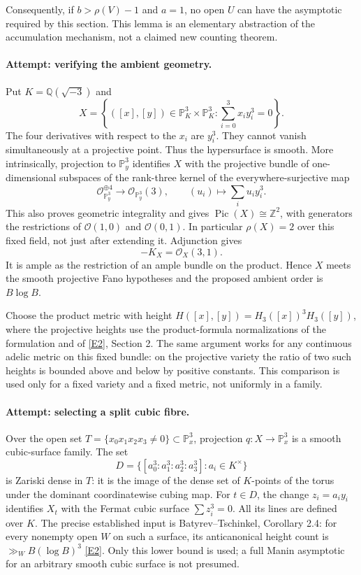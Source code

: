 \documentclass[11pt,a4paper]{article}
\newcommand{\Z}{\mathbb{Z}}
\newcommand{\Q}{\mathbb{Q}}
\newcommand{\PP}{\mathbb P}
\newcommand{\eref}[2]{\hyperlink{extra:#1:#2}{[E#2]}}
\numberwithin{equation}{section}
\begin{document}
Consequently, if $b>\rho(V)-1$ and $a=1$, no open $U$ can have the
asymptotic required by this section. This lemma is an elementary
abstraction of the accumulation mechanism, not a claimed new counting
theorem.

\paragraph{Attempt: verifying the ambient geometry.}
Put $K=\Q(\sqrt{-3})$ and
\begin{equation}\label{statement:variety}
 X=\left\{([x],[y])\in\PP^3_K\times\PP^3_K:
           \sum_{i=0}^3x_i y_i^3=0\right\}.
\end{equation}
The four derivatives with respect to the $x_i$ are $y_i^3$. They cannot
vanish simultaneously at a projective point. Thus the hypersurface is
smooth. More intrinsically, projection to $\PP^3_y$ identifies $X$ with
the projective bundle of one-dimensional subspaces of the rank-three
kernel of the everywhere-surjective map
\[
 \mathcal O_{\PP^3_y}^{\oplus4}\longrightarrow
 \mathcal O_{\PP^3_y}(3),\qquad
 (u_i)\longmapsto\sum_i u_i y_i^3.
\]
This also proves geometric integrality and gives
$\operatorname{Pic}(X)\cong\Z^2$, with generators the restrictions of
$\mathcal O(1,0)$ and $\mathcal O(0,1)$. In particular $\rho(X)=2$ over
this fixed field, not just after extending it. Adjunction gives
\begin{equation}\label{statement:anticanonical}
 -K_X=\mathcal O_X(3,1).
\end{equation}
It is ample as the restriction of an ample bundle on the product. Hence
$X$ meets the smooth projective Fano hypotheses and the proposed ambient
order is $B\log B$.

Choose the product metric with height
$H([x],[y])=H_3([x])^3H_3([y])$, where the projective heights use the
product-formula normalizations of the formulation and of
\eref{statement}{2}, Section 2. The same argument works for any continuous
adelic metric on this fixed bundle: on the projective variety the ratio
of two such heights is bounded above and below by positive constants.
This comparison is used only for a fixed variety and a fixed metric, not
uniformly in a family.

\paragraph{Attempt: selecting a split cubic fibre.}
Over the open set $T=\{x_0x_1x_2x_3\ne0\}\subset\PP^3_x$, projection
$q:X\to\PP^3_x$ is a smooth cubic-surface family. The set
\[
 D=\{[a_0^3:a_1^3:a_2^3:a_3^3]:a_i\in K^\times\}
\]
is Zariski dense in $T$: it is the image of the dense set of $K$-points
of the torus under the dominant coordinatewise cubing map. For $t\in D$,
the change $z_i=a_i y_i$ identifies $X_t$ with the Fermat cubic surface
$\sum z_i^3=0$. All its lines are defined over $K$. The precise
established input is Batyrev--Tschinkel, Corollary 2.4: for every nonempty
open $W$ on such a surface, its anticanonical height count is
$\gg_W B(\log B)^3$ \eref{statement}{2}. Only this lower bound is used; a full
Manin asymptotic for an arbitrary smooth cubic surface is not presumed.
\end{document}
